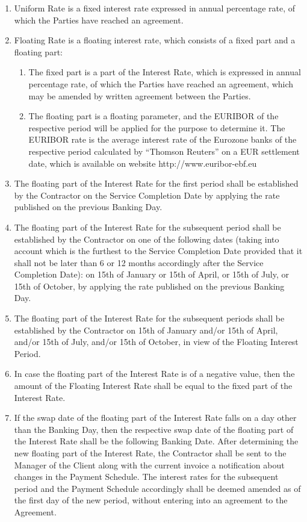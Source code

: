 \begin{enumerate}[label=\arabic*.]
	\item Uniform Rate is a fixed interest rate expressed in annual percentage rate, of which the Parties have reached an agreement.
	\item Floating Rate is a floating interest rate, which consists of a fixed part and a floating part:
	\begin{enumerate}
		\item The fixed part is a part of the Interest Rate, which is expressed in annual percentage rate, of which the Parties have reached an agreement, which may be amended by written agreement between the Parties.
		\item The floating part is a floating parameter, and the EURIBOR of the respective period will be applied for the purpose to determine it. The EURIBOR rate is the average interest rate of the Eurozone banks of the respective period calculated by “Thomson Reuters” on a EUR settlement date, which is available on website http://www.euribor-ebf.eu
	\end{enumerate}
	\item The floating part of the Interest Rate for the first period shall be established by the Contractor on the Service Completion Date by applying the rate published on the previous Banking Day.
	\item The floating part of the Interest Rate for the subsequent period shall be established by the Contractor on one of the following dates (taking into account which is the furthest to the Service Completion Date provided that it shall not be later than 6 or 12 months accordingly after the Service Completion Date): on 15th of January or 15th of April, or 15th of July, or 15th of October, by applying the rate published on the previous Banking Day.
	\item The floating part of the Interest Rate for the subsequent periods shall be established by the Contractor on 15th of January and/or 15th of April, and/or 15th of July, and/or 15th of October, in view of the Floating Interest Period.
	\item In case the floating part of the Interest Rate is of a negative value, then the amount of the Floating Interest Rate shall be equal to the fixed part of the Interest Rate.
	\item If the swap date of the floating part of the Interest Rate falls on a day other than the Banking Day, then the respective swap date of the floating part of the Interest Rate shall be the following Banking Date. After determining the new floating part of the Interest Rate, the Contractor shall be sent to the Manager of the Client along with the current invoice a notification about changes in the Payment Schedule. The interest rates for the subsequent period and the Payment Schedule accordingly shall be deemed amended as of the first day of the new period, without entering into an agreement to the Agreement.

\end{enumerate}
